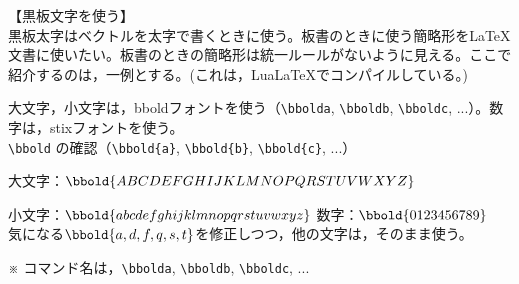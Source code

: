 \documentclass{ltjsarticle}
\begin{document}
\Large
【黒板文字を使う】\\
黒板太字はベクトルを太字で書くときに使う。板書のときに使う簡略形を{\LaTeX}文書に使いたい。板書のときの簡略形は統一ルールがないように見える。ここで紹介するのは，一例とする。(これは，Lua\LaTeX でコンパイルしている。)

大文字，小文字は，bboldフォントを使う（\verb|\bbolda|, \verb|\bboldb|, \verb|\bboldc|, ...）。数字は，stixフォントを使う。\\

\verb|\bbold| の確認（\verb|\bbold{a}|, \verb|\bbold{b}|, \verb|\bbold{c}|, ...）\par
大文字：$\bbold{ABCDEFGHIJKLMNOPQRSTUVWXYZ}$\par
小文字：$\bbold{abcdefghijklmnopqrstuvwxyz}$\qquad
数字：$\bbold{0123456789}$\\

気になる$\bbold{a,d,f,q,s,t}$を修正しつつ，他の文字は，そのまま使う。\par
※ コマンド名は，\verb|\bbolda|, \verb|\bboldb|, \verb|\bboldc|, ...
\newcommand{\bbolda}
{\rlap{\hspace{0.94ex}\setlength{\fboxsep}{0pt}\fboxrule=.09ex\raise.093ex\hbox{\framebox[.37ex]{\rule[0ex]{0ex}{.82ex}}}}\bbold{a}\hspace{.3ex}}
\newcommand{\bboldb}{\bbold{b}}
\newcommand{\bboldc}{\bbold{c}}
\newcommand{\bboldd}
{\hspace{.2ex}\rlap{\hspace{.23ex}\rule[.1ex]{.1ex}{.84ex}}\scalebox{-1}[1]{$\bbold{b}$}}
\newcommand{\bbolde}{\bbold{e}}
\newcommand{\bboldf}
{\hspace{.2ex}\rlap{\hspace{-.05ex}\rule[.9ex]{.2ex}{.1ex}}\bbold{f}}
\newcommand{\bboldg}{\bbold{g}}
\newcommand{\bboldh}{\bbold{h}}
\newcommand{\bboldi}{\bbold{i}}
\newcommand{\bboldj}{\bbold{j}}
\newcommand{\bboldk}{\bbold{k}}
\newcommand{\bboldl}{\bbold{l}}
\newcommand{\bboldm}{\bbold{m}}
\newcommand{\bboldn}{\bbold{n}}
\newcommand{\bboldo}{\bbold{o}}
\newcommand{\bboldp}{\bbold{p}}
\newcommand{\bboldq}
{\hspace{.2ex}\rlap{\hspace{.25ex}\rule[.07ex]{.1ex}{.86ex}}\scalebox{-1}[1]{$\bbold{p}$}}
\newcommand{\bboldr}{\bbold{r}}
\newcommand{\bbolds}
{\rlap{\hspace{.5ex}\rule[-.02ex]{.08ex}{.6ex}}\bbold{s}}
\newcommand{\bboldt}
{\hspace{.1ex}\hspace{.09ex}\rlap{\hspace{-.09ex}\rule[.9ex]{.3ex}{.1ex}}\bbold{t}}
\newcommand{\bboldu}{\bbold{u}}
\newcommand{\bboldv}{\bbold{v}}
\newcommand{\bboldw}{\bbold{w}}
\newcommand{\bboldx}{\bbold{x}}
\newcommand{\bboldy}{\bbold{y}}
\newcommand{\bboldz}{\bbold{z}}
\end{document}
